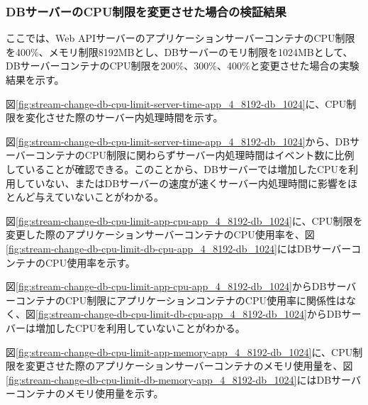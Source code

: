 \documentclass[../../../../main]{subfiles}
\begin{document}
    \subsubsection{DBサーバーのCPU制限を変更させた場合の検証結果}\label{subsubsec:result-streaming-change-db-cpu}

    ここでは、Web APIサーバーのアプリケーションサーバーコンテナのCPU制限を400\%、メモリ制限8192MBとし、DBサーバーのモリ制限を1024MBとして、DBサーバーコンテナのCPU制限を200\%、300\%、400\%と変更させた場合の実験結果を示す。


    図\ref{fig:stream-change-db-cpu-limit-server-time-app_4_8192-db_1024}に、CPU制限を変化させた際のサーバー内処理時間を示す。

    

    図\ref{fig:stream-change-db-cpu-limit-server-time-app_4_8192-db_1024}から、DBサーバーコンテナのCPU制限に関わらずサーバー内処理時間はイベント数に比例していることが確認できる。このことから、DBサーバーでは増加したCPUを利用していない、またはDBサーバーの速度が速くサーバー内処理時間に影響をほとんど与えていないことがわかる。


    図\ref{fig:stream-change-db-cpu-limit-app-cpu-app_4_8192-db_1024}に、CPU制限を変更した際のアプリケーションサーバーコンテナのCPU使用率を、図\ref{fig:stream-change-db-cpu-limit-db-cpu-app_4_8192-db_1024}にはDBサーバーコンテナのCPU使用率を示す。

    

    

    図\ref{fig:stream-change-db-cpu-limit-app-cpu-app_4_8192-db_1024}からDBサーバーコンテナのCPU制限にアプリケーションコンテナのCPU使用率に関係性はなく、図\ref{fig:stream-change-db-cpu-limit-db-cpu-app_4_8192-db_1024}からDBサーバーは増加したCPUを利用していないことがわかる。


    図\ref{fig:stream-change-db-cpu-limit-app-memory-app_4_8192-db_1024}に、CPU制限を変更させた際のアプリケーションサーバーコンテナのメモリ使用量を、図\ref{fig:stream-change-db-cpu-limit-db-memory-app_4_8192-db_1024}にはDBサーバーコンテナのメモリ使用量を示す。

    
\end{document}
